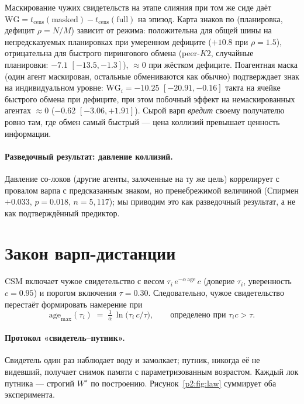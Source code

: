 \documentclass{article}
\newcommand{\wstar}{W^{\star}}
\begin{document}
Маскирование чужих свидетельств на этапе слияния при том же сиде даёт
$\mathrm{WG} = t_{\text{cens}}(\text{masked}) -
t_{\text{cens}}(\text{full})$ на эпизод. Карта знаков по (планировка,
дефицит $\rho{=}N/M$) зависит от режима: положительна для общей шины
на непредсказуемых планировках при умеренном дефиците ($+10.8$ при
$\rho{=}1.5$), отрицательна для быстрого пирингового обмена
(peer-$K2$, случайные планировки: $-7.1$ $[-13.5,-1.3]$),
${\approx}0$ при жёстком дефиците. Поагентная маска (один агент
маскирован, остальные обмениваются как обычно) подтверждает знак на
индивидуальном уровне: $\mathrm{WG}_i = -10.25$ $[-20.91,-0.16]$
такта на ячейке быстрого обмена при дефиците, при этом побочный
эффект на немаскированных агентах ${\approx}0$ ($-0.62$
$[-3.06,+1.91]$). Сырой варп \emph{вредит} своему получателю ровно
там, где обмен самый быстрый --- цена коллизий превышает ценность
информации. %

\paragraph{Разведочный результат: давление коллизий.} Давление
со-локов (другие агенты, залоченные на ту же цель) коррелирует с
провалом варпа с предсказанным знаком, но пренебрежимой величиной
(Спирмен $+0.033$, $p{=}0.018$, $n{=}5{,}117$); мы приводим это как
разведочный результат, а не как подтверждённый предиктор.

\section{Закон варп-дистанции}
\label{p2:sec:law}

CSM включает чужое свидетельство с весом $\tau_i\, e^{-\alpha\,
\text{age}}\, c$ (доверие $\tau_i$, уверенность $c{=}0.95$) и порогом
включения $\tau{=}0.30$. Следовательно, чужое свидетельство перестаёт
формировать намерение при
\[
\mathrm{age}_{\max}(\tau_i) \;=\; \tfrac{1}{\alpha}\,
\ln\!\big(\tau_i\, c / \tau\big), \qquad \text{определено при } \tau_i c > \tau .
\]

\paragraph{Протокол «свидетель--путник».} Свидетель один раз
наблюдает воду и замолкает; путник, никогда её не видевший, получает
снимок памяти с параметризованным возрастом. Каждый лок путника ---
строгий $\wstar$ по построению. Рисунок~\ref{p2:fig:law} суммирует оба
эксперимента.
\end{document}
